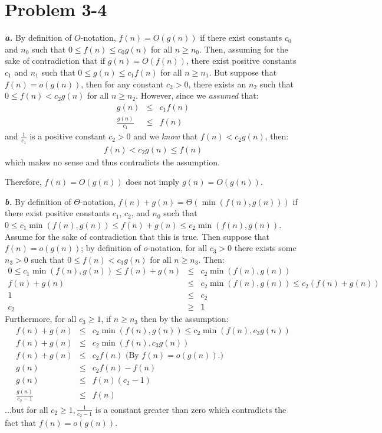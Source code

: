 \documentclass{article}
\begin{document}
\section*{Problem 3-4}

\noindent\textbf{\textit{a.}} By definition of $O$-notation, $f(n) = O(g(n))$ if there exist constants $c_0$ and $n_0$ such that $0 \leq f(n) \leq c_0 g(n)$ for all $n \geq n_0$. Then, assuming for the sake of contradiction that if $g(n) = O(f(n))$, there exist positive constants $c_1$ and $n_1$ such that $0 \leq g(n) \leq c_1 f(n)$ for all $n \geq n_1$. But suppose that $f(n) = o(g(n))$, then for any constant $c_2 > 0$, there exists an $n_2$ such that $0 \leq f(n) < c_2 g(n)$ for all $n \geq n_2$. However, since we \textit{assumed} that:
\begin{eqnarray*}
	g(n) & \leq & c_1 f(n) \\
	\frac{g(n)}{c_1} & \leq & f(n)
\end{eqnarray*}
and $\frac{1}{c_1}$ is a positive constant $c_2 > 0$ and we \textit{know} that $f(n) < c_2 g(n)$, then:
\begin{eqnarray*}
	f(n) < c_2 g(n) \leq f(n)
\end{eqnarray*}
which makes no sense and thus contradicts the assumption.

Therefore, $f(n) = O(g(n))$ does not imply $g(n) = O(g(n))$.

\noindent\textbf{\textit{b.}} By definition of $\Theta$-notation, $f(n) + g(n) = \Theta(\min(f(n),g(n)))$ if there exist positive constants $c_1$, $c_2$, and $n_0$ such that $0 \leq c_1 \min(f(n),g(n)) \leq f(n) + g(n) \leq c_2 \min(f(n),g(n))$. Assume for the sake of contradiction that this is true. Then suppose that $f(n) = o(g(n))$; by definition of $o$-notation, for all $c_3 > 0$ there exists some $n_3 > 0$ such that $0 \leq f(n) < c_3 g(n)$ for all $n \geq n_3$. Then:
\begin{eqnarray*}
	0 \leq c_1 \min(f(n),g(n)) \leq f(n) + g(n) & \leq & c_2 \min(f(n),g(n)) \\
	f(n) + g(n) & \leq & c_2 \min(f(n),g(n)) \leq c_2 (f(n) + g(n)) \\
	1 & \leq & c_2 \\
	c_2 & \geq & 1
\end{eqnarray*}
Furthermore, for all $c_3 \geq 1$, if $n \geq n_3$ then by the assumption:
\begin{eqnarray*}
	f(n) + g(n) & \leq & c_2 \min(f(n),g(n)) \leq c_2 \min(f(n),c_3 g(n)) \\
	f(n) + g(n) & \leq & c_2 \min(f(n),c_3 g(n)) \\
	f(n) + g(n) & \leq & c_2 f(n) \text{ (By $f(n) = o(g(n))$.)} \\
	g(n) & \leq & c_2 f(n) - f(n) \\
	g(n) & \leq & f(n)(c_2 - 1) \\
	\frac{g(n)}{c_2 - 1} & \leq & f(n)
\end{eqnarray*}
...but for all $c_2 \geq 1, \frac{1}{c_2 - 1}$ is a constant greater than zero which contradicts the fact that $f(n) = o(g(n))$.
\end{document}
